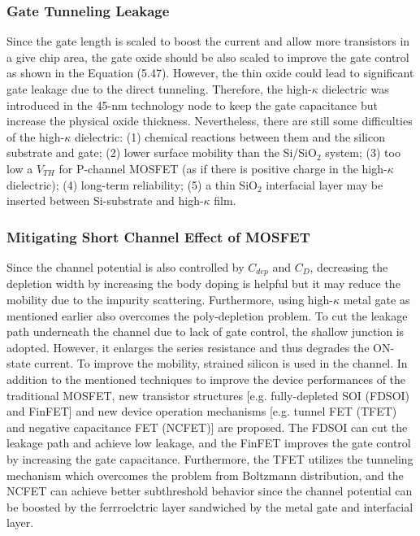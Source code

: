 \subsubsection{Gate Tunneling Leakage}
Since the gate length is scaled to boost the current and allow more transistors in a give chip area, the gate oxide should be also scaled to improve the gate control as shown in the Equation (5.47). However, the thin oxide could lead to significant gate leakage due to the direct tunneling. Therefore, the high-$\kappa$ dielectric was introduced in the 45-nm technology node to keep the gate capacitance but increase the physical oxide thickness. Nevertheless, there are still some difficulties of the high-$\kappa$ dielectric: (1) chemical reactions between them and the silicon substrate and gate; (2) lower surface mobility than the Si/SiO$_{2}$ system; (3) too low a $V_{TH}$ for P-channel MOSFET (as if there is positive charge in the high-$\kappa$ dielectric); (4) long-term reliability; (5) a thin SiO$_{2}$ interfacial layer may be inserted between Si-substrate and high-$\kappa$ film.
\subsubsection{Mitigating Short Channel Effect of MOSFET}
Since the channel potential is also controlled by $C_{dep}$ and $C_{D}$, decreasing the depletion width by increasing the body doping is helpful but it may reduce the mobility due to the impurity scattering. Furthermore, using high-$\kappa$ metal gate as mentioned earlier also overcomes the poly-depletion problem. To cut the leakage path underneath the channel due to lack of gate control, the shallow junction is adopted. However, it enlarges the series resistance and thus degrades the ON-state current. To improve the mobility, strained silicon is used in the channel. In addition to the mentioned techniques to improve the device performances of the traditional MOSFET, new transistor structures [e.g. fully-depleted SOI (FDSOI) and FinFET] and new device operation mechanisms [e.g. tunnel FET (TFET) and negative capacitance FET (NCFET)] are proposed. The FDSOI can cut the leakage path and achieve low leakage, and the FinFET improves the gate control by increasing the gate capacitance. Furthermore, the TFET utilizes the tunneling mechanism which overcomes the problem from Boltzmann distribution, and the NCFET can achieve better subthreshold behavior since the channel potential can be boosted by the ferrroelctric layer sandwiched by the metal gate and interfacial layer.
